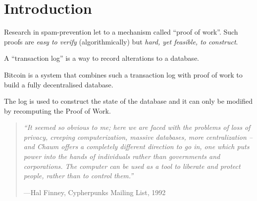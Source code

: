 
\section*{Introduction}

Research in spam-prevention let to a mechanism called ``proof of work''.
Such proofs are \emph{easy to verify} (algorithmically) but \emph{hard, yet feasible, to construct}.

A ``transaction log'' is a way to record alterations to a database.

Bitcoin is a system that combines such a transaction log with proof of work
to build a fully decentralised database.

The log is used to construct the state of the database and it can only be
modified by recomputing the Proof of Work.


\begin{quotation}
{\it 
``It seemed so obvious to me; here we are faced with the problems of
loss of privacy, creeping computerization, massive databases, more
centralization -- and Chaum offers a completely different direction to go in, one which puts power into the hands of individuals rather than governments and corporations. The computer can be used as a tool to liberate and protect people, rather than to control them.''}

\hspace{1.5em plus 1fill}---Hal Finney, Cypherpunks Mailing List, 1992
\end{quotation}
